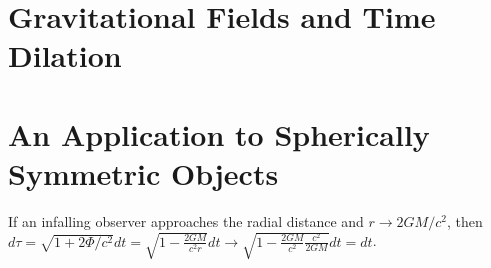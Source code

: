 \documentclass[12pt]{article}
\theoremstyle{definition}
\theoremstyle{remark}
\begin{document}
\section{Gravitational Fields and Time Dilation}

\section{An Application to Spherically Symmetric Objects}
If an infalling observer approaches the radial distance and $r\rightarrow2GM/c^2$, then $d\tau = \sqrt{1+2\Phi/c^2}dt=\sqrt{1-\frac{2GM}{c^2r}}dt\rightarrow \sqrt{1-\frac{2GM}{c^2}\frac{c^2}{2GM}}dt=dt$.












































\end{document}
